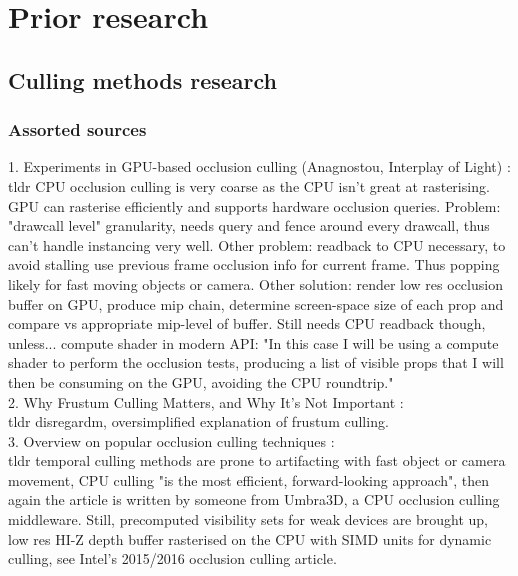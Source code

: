 
\chapter{Prior research}\label{chapter:introduction}

\section{Culling methods research}
\subsection{Assorted sources}
1. Experiments in GPU-based occlusion culling (Anagnostou, Interplay of Light) \cite{Anagnostou.2017}: \\
tldr CPU occlusion culling is very coarse as the CPU isn't great at rasterising. GPU can rasterise efficiently and supports hardware occlusion queries. Problem: "drawcall level" granularity, needs query and fence around every drawcall, thus can't handle instancing very well. Other problem: readback to CPU necessary, to avoid stalling use previous frame occlusion info for current frame. Thus popping likely for fast moving objects or camera. 
Other solution: render low res occlusion buffer on GPU, produce mip chain, determine screen-space size of each prop and compare vs appropriate mip-level of buffer. Still needs CPU readback though, unless... compute shader in modern API: "In this case I will be using a compute shader to perform the occlusion tests, producing a list of visible props that I will then be consuming on the GPU, avoiding the CPU roundtrip."\\

2. Why Frustum Culling Matters, and Why It's Not Important \cite{Barrett.2017}: \\
tldr disregardm, oversimplified explanation of frustum culling.\\

3. Overview on popular occlusion culling techniques \cite{gamesindustry.biz.2016}: \\
tldr temporal culling methods are prone to artifacting with fast object or camera movement, CPU culling "is the most efficient, forward-looking approach", then again the article is written by someone from Umbra3D, a CPU occlusion culling middleware. 
Still, precomputed visibility sets for weak devices are brought up, low res HI-Z depth buffer rasterised on the CPU with SIMD units for dynamic culling, see Intel's 2015/2016 occlusion culling article.\\

